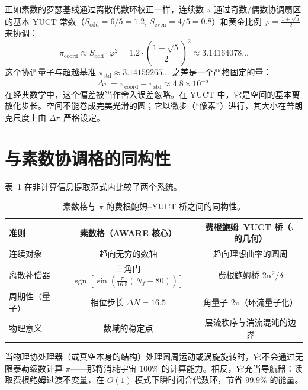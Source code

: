 \documentclass[12pt,a4paper]{article}
\newcommand{\Sodd}{S_{\mathrm{odd}}}
\newcommand{\Seven}{S_{\mathrm{even}}}
\begin{document}
	正如素数的罗瑟基线通过离散代数环校正一样，连续数 $\pi$ 通过奇数/偶数协调扇区的基本 YUCT 常数（$\Sodd = 6/5 = 1.2$, $\Seven = 4/5 = 0.8$）和黄金比例 $\varphi = \frac{1+\sqrt{5}}{2}$ 来协调：
	\begin{equation}
		\pi_{\mathrm{coord}} \approx \Sodd \cdot \varphi^2 = 1.2 \cdot \left(\frac{1+\sqrt{5}}{2}\right)^2 \approx 3.14164078\ldots
		\label{eq:pi-approx}
	\end{equation}
	这个协调量子与超越基准 $\pi_{\mathrm{std}} \approx 3.14159265\ldots$ 之差是一个严格固定的量：
	\begin{equation}
		\Delta\pi = \pi_{\mathrm{coord}} - \pi_{\mathrm{std}} \approx 4.8 \times 10^{-5}.
		\label{eq:delta-pi-val}
	\end{equation}
	在经典数学中，这个偏差被当作舍入误差忽略。在 YUCT 中，它是空间的基本离散化步长。空间不能卷成完美光滑的圆；它以微步（“像素”）进行，其大小在普朗克尺度上由 $\Delta\pi$ 严格设定。
	
	\section{与素数协调格的同构性}
	\label{sec:isomorphism}
	
	表~\ref{tab:isomorphism} 在非计算信息提取范式内比较了两个系统。
	
	\begin{table}[H]
		\centering
		\scriptsize
		\caption{素数格与 $\pi$ 的费根鲍姆–YUCT 桥之间的同构性。}
		\label{tab:isomorphism}
		\begin{tabular}{@{}lcc@{}}
			\toprule
			\textbf{准则} & \textbf{素数格（AWARE 核心）} & \textbf{费根鲍姆–YUCT 桥（$\pi$ 的几何）} \\
			\midrule
			连续对象 & 趋向无穷的数轴 & 趋向理想曲率的圆周 \\
			离散补偿器 & 三角门 $\operatorname{sgn}[\sin(\frac{\pi}{16.5}(N_f-80))]$ & 费根鲍姆桥 $2\alpha^2/\delta$ \\
			周期性（量子） & 相位步长 $\Delta N = 16.5$ & 角量子 $2\pi$（环流量子化） \\
			物理意义 & 数域的稳定点 & 层流秩序与湍流混沌的边界 \\
			\bottomrule
		\end{tabular}
	\end{table}
	
	当物理协处理器（或真空本身的结构）处理圆周运动或涡旋旋转时，它不会通过无限泰勒级数计算 $\pi$——那将消耗宇宙 $100\%$ 的计算能力。相反，它充当导航器：读取费根鲍姆过渡不变量，在 $O(1)$ 模式下瞬时闭合代数环，节省 $99.9\%$ 的能量。
	
\end{document}
